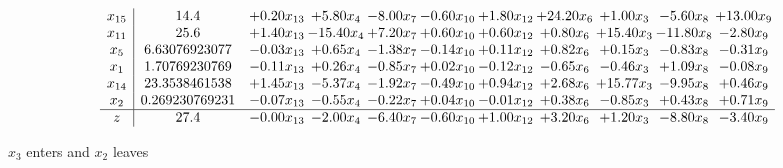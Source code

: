 \documentclass[9pt]{article}
\begin{document}
 \[\begin{array}{c| c c@{\hskip 2pt} c@{\hskip 2pt} c@{\hskip 2pt} c@{\hskip 2pt} c@{\hskip 2pt} c@{\hskip 2pt} c@{\hskip 2pt} c@{\hskip 2pt} c@{\hskip 2pt} }
 x_{15}   &  14.4 & +  0.20 x_{13} & +  5.80 x_{4} & -8.00 x_{7} & -0.60 x_{10} & +  1.80 x_{12} & + 24.20 x_{6} & +  1.00 x_{3} & -5.60 x_{8} & + 13.00 x_{9}\\
 x_{11}   &  25.6 & +  1.40 x_{13} & -15.40 x_{4} & +  7.20 x_{7} & +  0.60 x_{10} & +  0.60 x_{12} & +  0.80 x_{6} & + 15.40 x_{3} & -11.80 x_{8} & -2.80 x_{9}\\
 x_{5}   &  6.63076923077 & -0.03 x_{13} & +  0.65 x_{4} & -1.38 x_{7} & -0.14 x_{10} & +  0.11 x_{12} & +  0.82 x_{6} & +  0.15 x_{3} & -0.83 x_{8} & -0.31 x_{9}\\
 x_{1}   &  1.70769230769 & -0.11 x_{13} & +  0.26 x_{4} & -0.85 x_{7} & +  0.02 x_{10} & -0.12 x_{12} & -0.65 x_{6} & -0.46 x_{3} & +  1.09 x_{8} & -0.08 x_{9}\\
 x_{14}   &  23.3538461538 & +  1.45 x_{13} & -5.37 x_{4} & -1.92 x_{7} & -0.49 x_{10} & +  0.94 x_{12} & +  2.68 x_{6} & + 15.77 x_{3} & -9.95 x_{8} & +  0.46 x_{9}\\
 x_{2}   &  0.269230769231 & -0.07 x_{13} & -0.55 x_{4} & -0.22 x_{7} & +  0.04 x_{10} & -0.01 x_{12} & +  0.38 x_{6} & -0.85 x_{3} & +  0.43 x_{8} & +  0.71 x_{9}\\
\hline
z    &  27.4 & -0.00 x_{13} & -2.00 x_{4} & -6.40 x_{7} & -0.60 x_{10} & +  1.00 x_{12} & +  3.20 x_{6} & +  1.20 x_{3} & -8.80 x_{8} & -3.40 x_{9}\\
\end{array}\]


 $ x_{3} $ enters and $ x_{2} $ leaves 
\end{document}
